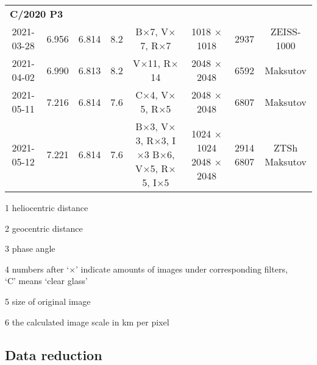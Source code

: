 \begin{table}
\begin{threeparttable}
{\begin{tabular}{cccccccc}
            \multicolumn{8}{l}{\textbf{C/2020 P3}} \\
            2021-03-28 & 6.956 & 6.814 & 8.2 & B$\times$7, V$\times$7, R$\times$7 & 1018 $\times$ 1018 & 2937 & ZEISS-1000 \\
            2021-04-02 & 6.990 & 6.813 & 8.2 & V$\times$11, R$\times$14 & 2048 $\times$ 2048 & 6592 & Maksutov \\
            2021-05-11 & 7.216 & 6.814 & 7.6 & C$\times$4, V$\times$5, R$\times$5 & 2048 $\times$ 2048 & 6807 & Maksutov \\
            2021-05-12 & 7.221 & 6.814 & 7.6 & \makecell[c]{B$\times$3, V$\times$3, R$\times$3, I$\times$3 \\ B$\times$6, V$\times$5, R$\times$5, I$\times$5} & \makecell[c]{1024 $\times$ 1024 \\ 2048 $\times$ 2048}  & \makecell[c]{2914 \\ 6807} & \makecell[c]{ZTSh \\ Maksutov} \\
            \bottomrule
        \end{tabular}
        }
        \begin{tablenotes}
            \item[1] heliocentric distance
            \item[2] geocentric distance
            \item[3] phase angle
            \item[4] numbers after `$\times$' indicate amounts of images under corresponding filters, \\
            `C' means `clear glass'
            \item[5] size of original image
            \item[6] the calculated image scale in \si{\km} per pixel
        \end{tablenotes}
    \end{threeparttable}
\end{table}

\subsection{Data reduction}


